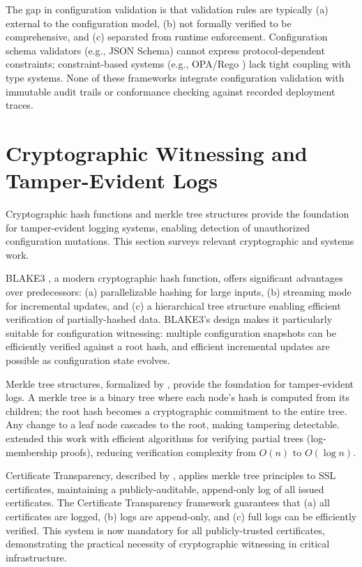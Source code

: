 The gap in configuration validation is that validation rules are typically (a) external to the configuration model, (b) not formally verified to be comprehensive, and (c) separated from runtime enforcement. Configuration schema validators (e.g., JSON Schema) cannot express protocol-dependent constraints; constraint-based systems (e.g., OPA/Rego \citep{Sass2023}) lack tight coupling with type systems. None of these frameworks integrate configuration validation with immutable audit trails or conformance checking against recorded deployment traces.

\section{Cryptographic Witnessing and Tamper-Evident Logs}

Cryptographic hash functions and merkle tree structures provide the foundation for tamper-evident logging systems, enabling detection of unauthorized configuration mutations. This section surveys relevant cryptographic and systems work.

BLAKE3 \citep{Aumasson2020}, a modern cryptographic hash function, offers significant advantages over predecessors: (a) parallelizable hashing for large inputs, (b) streaming mode for incremental updates, and (c) a hierarchical tree structure enabling efficient verification of partially-hashed data. BLAKE3's design makes it particularly suitable for configuration witnessing: multiple configuration snapshots can be efficiently verified against a root hash, and efficient incremental updates are possible as configuration state evolves.

Merkle tree structures, formalized by \citet{Merkle1989}, provide the foundation for tamper-evident logs. A merkle tree is a binary tree where each node's hash is computed from its children; the root hash becomes a cryptographic commitment to the entire tree. Any change to a leaf node cascades to the root, making tampering detectable. \citet{Blum1999} extended this work with efficient algorithms for verifying partial trees (log-membership proofs), reducing verification complexity from $O(n)$ to $O(\log n)$.

Certificate Transparency, described by \citet{Laurie2013}, applies merkle tree principles to SSL certificates, maintaining a publicly-auditable, append-only log of all issued certificates. The Certificate Transparency framework guarantees that (a) all certificates are logged, (b) logs are append-only, and (c) full logs can be efficiently verified. This system is now mandatory for all publicly-trusted certificates, demonstrating the practical necessity of cryptographic witnessing in critical infrastructure.

